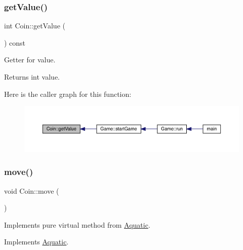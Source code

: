 \subsubsection{\texorpdfstring{get\+Value()}{getValue()}}
{\footnotesize\ttfamily int Coin\+::get\+Value (\begin{DoxyParamCaption}{ }\end{DoxyParamCaption}) const}



Getter for value. 

\begin{DoxyReturn}{Returns}
int value. 
\end{DoxyReturn}
Here is the caller graph for this function\+:\nopagebreak
\begin{figure}[H]
\begin{center}
\leavevmode
\includegraphics[width=350pt]{class_coin_a53c8bf65afdde1422cfda51d753d74b7_icgraph}
\end{center}
\end{figure}
\mbox{\label{class_coin_ab62bca5834489b9b483deaa3ca3470e9}} 
\subsubsection{\texorpdfstring{move()}{move()}}
{\footnotesize\ttfamily void Coin\+::move (\begin{DoxyParamCaption}{ }\end{DoxyParamCaption})\hspace{0.3cm}{\ttfamily [virtual]}}



Implements pure virtual method from \mbox{\hyperlink{class_aquatic}{Aquatic}}. 



Implements \mbox{\hyperlink{class_aquatic_a962e93c804814eeaf3cea6e26698eef7}{Aquatic}}.

